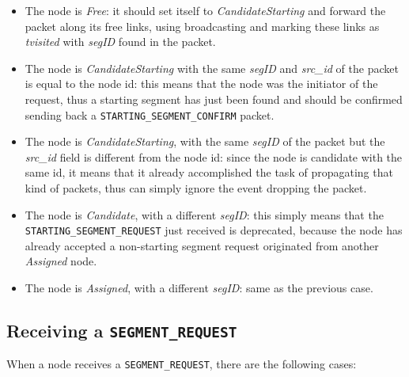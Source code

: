 \begin{itemize}
\item The node is \emph{Free}: it should set itself to
\emph{CandidateStarting} and forward the packet along its free links, using
broadcasting and marking these links as \emph{tvisited} with \emph{segID} found
in the packet.
\item The node is \emph{CandidateStarting} with the same
\emph{segID} and \emph{src\_id} of the packet is equal to the node id:
this means that the node was the initiator of the request, thus a starting segment has
just been found and should be confirmed sending back a \texttt{STARTING\_SEGMENT\_CONFIRM}
packet.  
\item The node is \emph{CandidateStarting}, with the same \emph{segID} of the
packet but the \emph{src\_id} field is different from the node id: since the node is candidate with the same id, it means
that it already accomplished the task of propagating that kind of
packets, thus can simply ignore the event dropping the packet.  
\item The node is \emph{Candidate}, with a different \emph{segID}: 
this simply means that the \texttt{STARTING\_SEGMENT\_REQUEST} just received is deprecated,
because the node has already accepted a non-starting segment request originated from another \emph{Assigned} node.
\item The node is \emph{Assigned}, with a different \emph{segID}:
same as the previous case. 


\end{itemize}

\subsection{Receiving a \texttt{SEGMENT\_REQUEST}}
When a node receives a \texttt{SEGMENT\_REQUEST}, there are the following cases:

